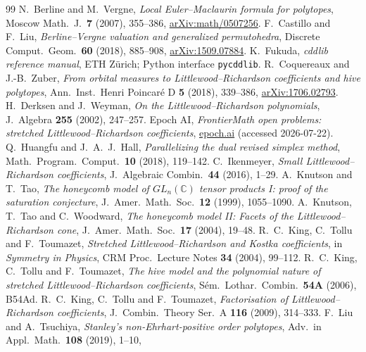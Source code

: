 \documentclass[11pt]{amsart}
\theoremstyle{definition}
\begin{document}
\begin{thebibliography}{99}
 N.~Berline and M.~Vergne, \emph{Local Euler--Maclaurin
formula for polytopes}, Moscow Math.\ J.\ \textbf{7} (2007), 355--386,
\href{https://arxiv.org/abs/math/0507256}{arXiv:math/0507256}.
 F.~Castillo and F.~Liu, \emph{Berline--Vergne valuation
and generalized permutohedra}, Discrete Comput.\ Geom.\ \textbf{60} (2018),
885--908, \href{https://arxiv.org/abs/1509.07884}{arXiv:1509.07884}.
 K.~Fukuda, \emph{cddlib reference manual}, ETH Z\"urich;
Python interface \texttt{pycddlib}.
 R.~Coquereaux and J.-B.~Zuber, \emph{From orbital measures to
Littlewood--Richardson coefficients and hive polytopes}, Ann.\ Inst.\ Henri
Poincar\'e D \textbf{5} (2018), 339--386,
\href{https://arxiv.org/abs/1706.02793}{arXiv:1706.02793}.
 H.~Derksen and J.~Weyman, \emph{On the
Littlewood--Richardson polynomials}, J.\ Algebra \textbf{255} (2002), 247--257.
 Epoch AI, \emph{FrontierMath open problems: stretched
Littlewood--Richardson coefficients},
\href{https://epoch.ai/frontiermath/open-problems/stretched-lr-coefficients}{epoch.ai}
(accessed 2026-07-22).
 Q.~Huangfu and J.~A.~J.~Hall, \emph{Parallelizing the dual
revised simplex method}, Math.\ Program.\ Comput.\ \textbf{10} (2018), 119--142.
 C.~Ikenmeyer, \emph{Small Littlewood--Richardson
coefficients}, J.\ Algebraic Combin.\ \textbf{44} (2016), 1--29.
 A.~Knutson and T.~Tao, \emph{The honeycomb model of
$GL_n(\mathbb{C})$ tensor products I: proof of the saturation conjecture},
J.\ Amer.\ Math.\ Soc.\ \textbf{12} (1999), 1055--1090.
 A.~Knutson, T.~Tao and C.~Woodward, \emph{The honeycomb model II:
Facets of the Littlewood--Richardson cone}, J.\ Amer.\ Math.\ Soc.\ \textbf{17}
(2004), 19--48.
 R.~C.~King, C.~Tollu and F.~Toumazet, \emph{Stretched
Littlewood--Richardson and Kostka coefficients}, in \emph{Symmetry in Physics},
CRM Proc.\ Lecture Notes \textbf{34} (2004), 99--112.
 R.~C.~King, C.~Tollu and F.~Toumazet, \emph{The hive model and
the polynomial nature of stretched Littlewood--Richardson coefficients},
S\'em.\ Lothar.\ Combin.\ \textbf{54A} (2006), B54Ad.
 R.~C.~King, C.~Tollu and F.~Toumazet, \emph{Factorisation of
Littlewood--Richardson coefficients}, J.\ Combin.\ Theory Ser.\ A \textbf{116}
(2009), 314--333.
 F.~Liu and A.~Tsuchiya, \emph{Stanley's non-Ehrhart-positive
order polytopes}, Adv.\ in Appl.\ Math.\ \textbf{108} (2019), 1--10,

\end{thebibliography}
\end{document}
